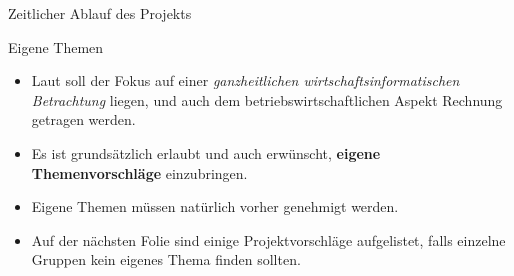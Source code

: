 \begin{dwHeaderFrame}{Zeitlicher Ablauf des Projekts}
\end{dwHeaderFrame}



\begin{dwHeaderFrame}{Eigene Themen}
	\begin{itemize}
		\item Laut \modulkatalog{} soll der Fokus auf einer \textit{\glqq{}ganzheitlichen wirtschaftsinformatischen Betrachtung\grqq{}} liegen,
			und auch dem betriebswirtschaftlichen Aspekt Rechnung getragen werden.
		\item Es ist grundsätzlich erlaubt und auch erwünscht, \textbf{eigene Themenvorschläge} einzubringen.
		\item Eigene Themen müssen natürlich vorher genehmigt werden.
		\item Auf der nächsten Folie sind einige Projektvorschläge aufgelistet, falls einzelne Gruppen kein eigenes Thema finden sollten.
	\end{itemize}
\end{dwHeaderFrame}

